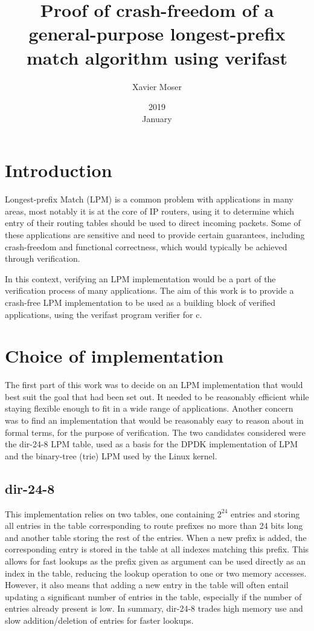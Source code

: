 \documentclass{article}
\title{Proof of crash-freedom of a general-purpose longest-prefix match algorithm using verifast}
\date{2019\\ January}
\author{Xavier Moser}
\begin{document}
\maketitle
\section{Introduction}
Longest-prefix Match (LPM) is a common problem with applications in many areas, most notably it is at the
core of IP routers, using it to determine which entry of their routing tables should
be used to direct incoming packets. Some of these applications are sensitive and
need to provide certain guarantees, including crash-freedom and functional correctness,
which would typically be achieved through verification. \par
In this context, verifying an LPM implementation
would be a part of the verification process of many applications. The aim of this
work is to provide a crash-free LPM implementation to be used as a building block of
verified applications, using the verifast program verifier for c.
\section{Choice of implementation}
The first part of this work was to decide on an LPM implementation that would best
suit the goal that had been set out. It needed to be reasonably efficient while staying
flexible enough to fit in a wide range of applications. Another concern was to find
an implementation that would be reasonably easy to reason about in formal terms, for
the purpose of verification. The two candidates considered were the dir-24-8 LPM
table, used as a basis for the DPDK implementation of LPM and the binary-tree (trie)
LPM used by the Linux kernel.
\subsection{dir-24-8}
This implementation relies on two tables, one containing $2^{24}$ entries and storing
all entries in the table corresponding to route prefixes no more than 24 bits long
and another table storing the rest of the entries. When a new prefix is added, the
corresponding entry is stored in the table at all indexes matching this prefix. This
allows for fast lookups as the prefix given as argument can be used directly as an
index in the table, reducing the lookup operation to one or two memory accesses.
However, it also means that adding a new entry in the table will often entail updating
a significant number of entries in the table, especially if the number of entries
already present is low. In summary, dir-24-8 trades high memory use and slow
addition/deletion of entries for faster lookups.
\end{document}
